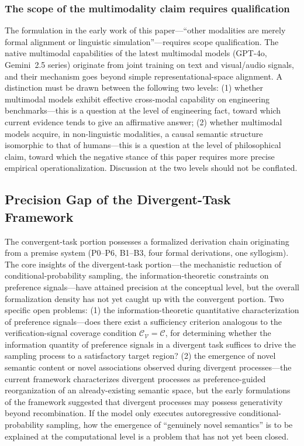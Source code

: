 \documentclass[11pt,a4paper]{article}
\theoremstyle{definition}
\newcommand{\verifspace}{\mathcal{C}_{\mathcal{V}}}
\newcommand{\taskcspace}{\mathcal{C}}
\begin{document}
\subsubsection{The scope of the multimodality claim requires qualification}

The formulation in the early work of this paper---``other modalities are merely formal alignment or linguistic simulation''---requires scope qualification. The native multimodal capabilities of the latest multimodal models (GPT-4o, Gemini~2.5 series) originate from joint training on text and visual/audio signals, and their mechanism goes beyond simple representational-space alignment. A distinction must be drawn between the following two levels: (1) whether multimodal models exhibit effective cross-modal capability on engineering benchmarks---this is a question at the level of engineering fact, toward which current evidence tends to give an affirmative answer; (2) whether multimodal models acquire, in non-linguistic modalities, a causal semantic structure isomorphic to that of humans---this is a question at the level of philosophical claim, toward which the negative stance of this paper requires more precise empirical operationalization. Discussion at the two levels should not be conflated.

\subsection{Precision Gap of the Divergent-Task Framework}

The convergent-task portion possesses a formalized derivation chain originating from a premise system (P0--P6, B1--B3, four formal derivations, one syllogism). The core insights of the divergent-task portion---the mechanistic reduction of conditional-probability sampling, the information-theoretic constraints on preference signals---have attained precision at the conceptual level, but the overall formalization density has not yet caught up with the convergent portion. Two specific open problems: (1) the information-theoretic quantitative characterization of preference signals---does there exist a sufficiency criterion analogous to the verification-signal coverage condition $\verifspace = \taskcspace$, for determining whether the information quantity of preference signals in a divergent task suffices to drive the sampling process to a satisfactory target region? (2) the emergence of novel semantic content or novel associations observed during divergent processes---the current framework characterizes divergent processes as preference-guided reorganization of an already-existing semantic space, but the early formulations of the framework suggested that divergent processes may possess generativity beyond recombination. If the model only executes autoregressive conditional-probability sampling, how the emergence of ``genuinely novel semantics'' is to be explained at the computational level is a problem that has not yet been closed.
\end{document}

